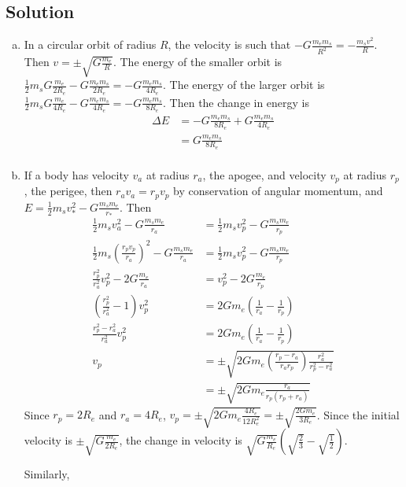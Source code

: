 \documentclass[solutions]{esg8012pset}
\begin{document}
\subsection{Solution}
\begin{enumerate}[(a)]
  \item In a circular orbit of radius $R$, the velocity is such that $-G\frac{m_e m_s}{R^2} = -\frac{m_s v^2}{R}$.  Then $v = \pm \sqrt{G\frac{m_e}{R}}$.  The energy of the smaller orbit is $\frac{1}{2} m_s G\frac{m_e}{2R_e} - G\frac{m_e m_s}{2R_e} = -G\frac{m_e m_s}{4R_e}$.  The energy of the larger orbit is $\frac{1}{2} m_s G\frac{m_e}{4R_e} - G\frac{m_e m_s}{4R_e} = -G\frac{m_e m_s}{8R_e}$.  Then the change in energy is \begin{align*}
 \Delta E & = -G\frac{m_e m_s}{8R_e} + G\frac{m_e m_s}{4R_e} \\
 & = G\frac{m_e m_s}{8R_e} \\
\end{align*}
  \item If a body has velocity $v_a$ at radius $r_a$, the apogee, and velocity $v_p$ at radius $r_p$, the perigee, then $r_a v_a = r_p v_p$ by conservation of angular momentum, and $E = \frac{1}{2} m_s v_*^2 - G\frac{m_s m_e}{r_*}$.  Then \begin{align*}
 \frac{1}{2} m_s v_a^2 - G\frac{m_s m_e}{r_a} & = \frac{1}{2} m_s v_p^2 - G\frac{m_s m_e}{r_p} \\
 \frac{1}{2} m_s \left(\frac{r_p v_p}{r_a}\right)^2 - G\frac{m_s m_e}{r_a} & = \frac{1}{2} m_s v_p^2 - G\frac{m_s m_e}{r_p} \\
 \frac{r_p^2}{r_a^2} v_p^2 - 2G\frac{m_e}{r_a} & = v_p^2 - 2G\frac{m_e}{r_p} \\
 \left(\frac{r_p^2}{r_a^2} - 1\right) v_p^2 & = 2Gm_e\left(\frac{1}{r_a} - \frac{1}{r_p}\right) \\
 \frac{r_p^2 - r_a^2}{r_a^2} v_p^2  & = 2Gm_e\left(\frac{1}{r_a} - \frac{1}{r_p}\right) \\
 v_p  & = \pm\sqrt{2Gm_e\left(\frac{r_p - r_a}{r_a r_p}\right)\frac{r_a^2}{r_p^2 - r_a^2}} \\
   & = \pm\sqrt{2Gm_e\frac{r_a}{r_p(r_p + r_a)}}
\end{align*}  Since $r_p = 2R_e$ and $r_a = 4R_e$, $v_p = \pm\sqrt{2Gm_e\frac{4R_e}{12R_e^2}} = \pm\sqrt{\frac{2G m_e}{3R_e}}$.  Since the initial velocity is $\pm \sqrt{G\frac{m_e}{2R_e}}$, the change in velocity is $\sqrt{G\frac{m_e}{R_e}}\left(\sqrt{\frac{2}{3}} - \sqrt{\frac{1}{2}}\right)$. \par
Similarly, \begin{align*}

\end{align*}
\end{enumerate}
\end{document}
